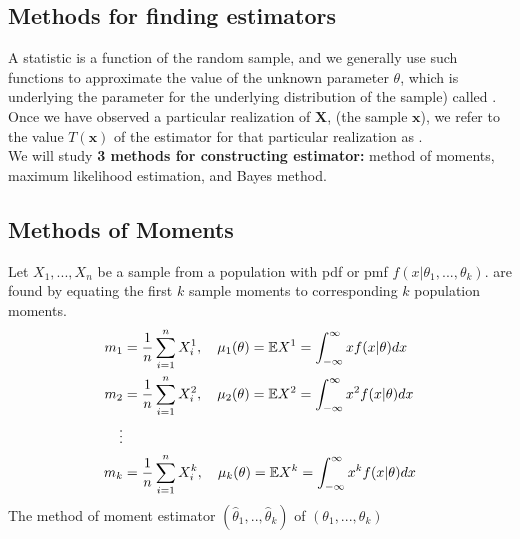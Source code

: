 \subsection{Methods for finding estimators}
A statistic is a function of the random sample, and we generally use such functions to approximate the value of the unknown parameter $\theta$, which is underlying the parameter for the underlying distribution of the sample) called . Once we have observed a particular realization of $\boldsymbol{X}$, (the sample $\boldsymbol{x}$), we refer to the value $T(\boldsymbol{x})$ of the estimator for that particular realization as .
\\
We will study \textbf{3 methods for constructing estimator:} method of moments, maximum likelihood estimation, and Bayes method.
\subsection{Methods of Moments}
Let $X_1,...,X_n$ be a sample from a population with pdf or pmf $f(x|\theta_1,...,\theta_k)$.  are found by equating the first $k$ sample moments to corresponding $k$ population moments.
\begin{align*}
    m_1 & = \frac{1}{n}\sum_{i=1}^{n}X_i^1, \quad \mu_1(\theta) = \mathbb E X^1  = \int_{-\infty}^{\infty}xf(x|\theta)dx\\
    m_2 & = \frac{1}{n}\sum_{i=1}^{n}X_i^2, \quad \mu_2(\theta) = \mathbb E X^2= \int_{-\infty}^{\infty}x^2f(x|\theta)dx \\
    \vdots \\ 
    m_k & = \frac{1}{n}\sum_{i=1}^{n}X_i^k, \quad \mu_k(\theta) = \mathbb E X^k = 
    \int_{-\infty}^{\infty}x^kf(x|\theta)dx
\end{align*}
The method of moment estimator $(\hat{\theta}_1,..,\hat{\theta}_k)$ of $(\theta_1,...,\theta_k)$ 